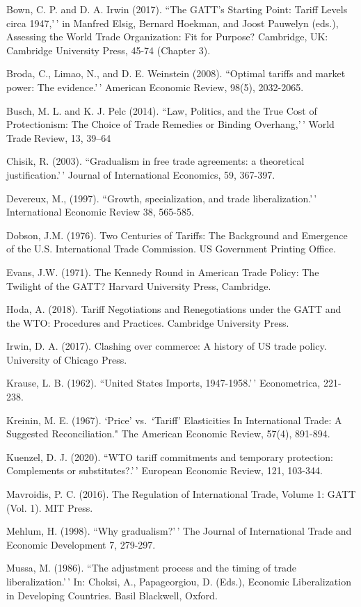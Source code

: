 \documentclass[
  12pt,
]{article}
\begin{document}
Bown, C. P. and D. A. Irwin (2017). ``The GATT's Starting Point: Tariff Levels circa 1947,'\,' in Manfred Elsig, Bernard Hoekman, and Joost Pauwelyn (eds.), Assessing the World Trade Organization: Fit for Purpose? Cambridge, UK: Cambridge University Press, 45-74 (Chapter 3).

Broda, C., Limao, N., and D. E. Weinstein (2008). ``Optimal tariffs and market power: The
evidence.'\,' American Economic Review, 98(5), 2032-2065.

Busch, M. L. and K. J. Pelc (2014). ``Law, Politics, and the True Cost of Protectionism: The Choice of Trade Remedies or Binding Overhang,'\,' World Trade Review, 13, 39--64

Chisik, R. (2003). ``Gradualism in free trade agreements: a theoretical justification.'\,' Journal of International Economics, 59, 367-397.

Devereux, M., (1997). ``Growth, specialization, and trade liberalization.'\,' International Economic Review
38, 565-585.

Dobson, J.M. (1976). Two Centuries of Tariffs: The Background and Emergence of the U.S. International Trade Commission. US Government Printing Office.

Evans, J.W. (1971). The Kennedy Round in American Trade Policy: The Twilight of the GATT? Harvard University Press, Cambridge.

Hoda, A. (2018). Tariff Negotiations and Renegotiations under the GATT and the WTO: Procedures and Practices. Cambridge University Press.

Irwin, D. A. (2017). Clashing over commerce: A history of US trade policy. University of Chicago Press.

Krause, L. B. (1962). ``United States Imports, 1947-1958.'\,' Econometrica, 221-238.

Kreinin, M. E. (1967). `\texttt{}Price' vs.~`Tariff' Elasticities In International Trade: A Suggested Reconciliation." The American Economic Review, 57(4), 891-894.

Kuenzel, D. J. (2020). ``WTO tariff commitments and temporary protection: Complements or substitutes?.'\,' European Economic Review, 121, 103-344.

Mavroidis, P. C. (2016). The Regulation of International Trade, Volume 1: GATT (Vol. 1). MIT Press.

Mehlum, H. (1998). ``Why gradualism?'\,' The Journal of International Trade and Economic Development 7, 279-297.

Mussa, M. (1986). ``The adjustment process and the timing of trade liberalization.'\,' In: Choksi, A., Papageorgiou, D. (Eds.), Economic Liberalization in Developing Countries. Basil Blackwell, Oxford.
\end{document}
